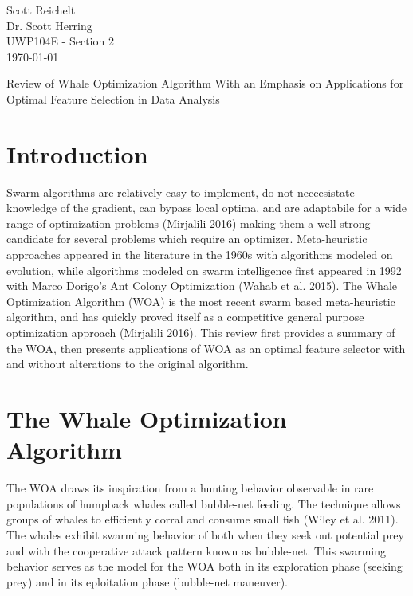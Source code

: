 \documentclass[11pt]{article}
\begin{document}
{ %
    \thispagestyle{empty}
    \begin{flushleft}
        Scott Reichelt\\
        Dr. Scott Herring\\
        UWP104E - Section 2\\
        \today\\
    \end{flushleft}
    \vspace{1em}
}
    \begin{center}
        Review of Whale Optimization Algorithm With an Emphasis on Applications for Optimal Feature Selection in Data Analysis
    \end{center}

\section*{Introduction} {
    Swarm algorithms are relatively easy to implement, do not neccesistate knowledge of the gradient, can bypass local optima, and are adaptabile for a wide range of optimization problems (Mirjalili 2016) making them a well strong candidate for several problems which require an optimizer.
    Meta-heuristic approaches appeared in the literature in the 1960s with algorithms modeled on evolution, while algorithms modeled on swarm intelligence first appeared in 1992 with Marco Dorigo's Ant Colony Optimization (Wahab et al. 2015).
    The Whale Optimization Algorithm (WOA) is the most recent swarm based meta-heuristic algorithm, and has quickly proved itself as a competitive general purpose optimization approach (Mirjalili 2016). 
    This review first provides a summary of the WOA, then presents applications of WOA as an optimal feature selector with and without alterations to the original algorithm.
}

\section*{The Whale Optimization Algorithm} {
    The WOA draws its inspiration from a hunting behavior observable in rare populations of humpback whales called bubble-net feeding.
    The technique allows groups of whales to efficiently corral and consume small fish (Wiley et al. 2011).
    The whales exhibit swarming behavior of both when they seek out potential prey and with the cooperative attack pattern known as bubble-net.
    This swarming behavior serves as the model for the WOA both in its exploration phase (seeking prey) and in its eploitation phase (bubble-net maneuver).
}
\end{document}
